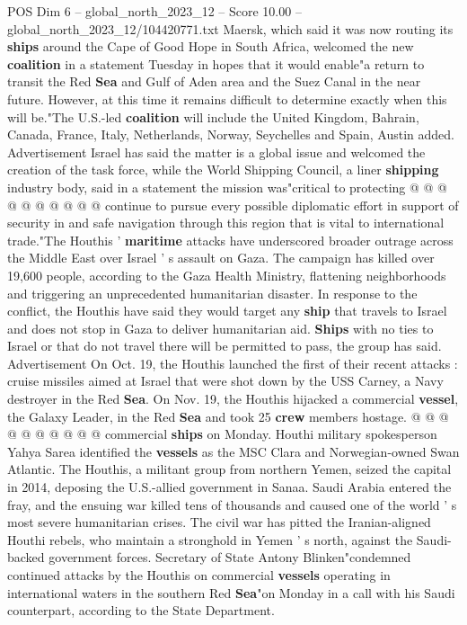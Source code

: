 \begin{textsample}{POS Dim 6 – global\_north\_2023\_12 – Score 10.00 – global\_north\_2023\_12/104420771.txt}
Maersk, which said it was now routing its \textbf{ships} around the Cape of Good Hope in South Africa, welcomed the new \textbf{coalition} in a statement Tuesday in hopes that it would enable"a return to transit the Red \textbf{Sea} and Gulf of Aden area and the Suez Canal in the near future.
However, at this time it remains difficult to determine exactly when this will be."The U.S.-led \textbf{coalition} will include the United Kingdom, Bahrain, Canada, France, Italy, Netherlands, Norway, Seychelles and Spain, Austin added.
Advertisement Israel has said the matter is a global issue and welcomed the creation of the task force, while the World Shipping Council, a liner \textbf{shipping} industry body, said in a statement the mission was"critical to protecting @ @ @ @ @ @ @ @ @ @ continue to pursue every possible diplomatic effort in support of security in and safe navigation through this region that is vital to international trade."The Houthis ' \textbf{maritime} attacks have underscored broader outrage across the Middle East over Israel ' s assault on Gaza.
The campaign has killed over 19,600 people, according to the Gaza Health Ministry, flattening neighborhoods and triggering an unprecedented humanitarian disaster.
In response to the conflict, the Houthis have said they would target any \textbf{ship} that travels to Israel and does not stop in Gaza to deliver humanitarian aid. \textbf{Ships} with no ties to Israel or that do not travel there will be permitted to pass, the group has said.
Advertisement On Oct. 19, the Houthis launched the first of their recent attacks : cruise missiles aimed at Israel that were shot down by the USS Carney, a Navy destroyer in the Red \textbf{Sea}.
On Nov. 19, the Houthis hijacked a commercial \textbf{vessel}, the Galaxy Leader, in the Red \textbf{Sea} and took 25 \textbf{crew} members hostage. @ @ @ @ @ @ @ @ @ @ commercial \textbf{ships} on Monday.
Houthi military spokesperson Yahya Sarea identified the \textbf{vessels} as the MSC Clara and Norwegian-owned Swan Atlantic.
The Houthis, a militant group from northern Yemen, seized the capital in 2014, deposing the U.S.-allied government in Sanaa.
Saudi Arabia entered the fray, and the ensuing war killed tens of thousands and caused one of the world ' s most severe humanitarian crises.
The civil war has pitted the Iranian-aligned Houthi rebels, who maintain a stronghold in Yemen ' s north, against the Saudi-backed government forces.
Secretary of State Antony Blinken"condemned continued attacks by the Houthis on commercial \textbf{vessels} operating in international waters in the southern Red \textbf{Sea}"on Monday in a call with his Saudi counterpart, according to the State Department.

\end{textsample}
